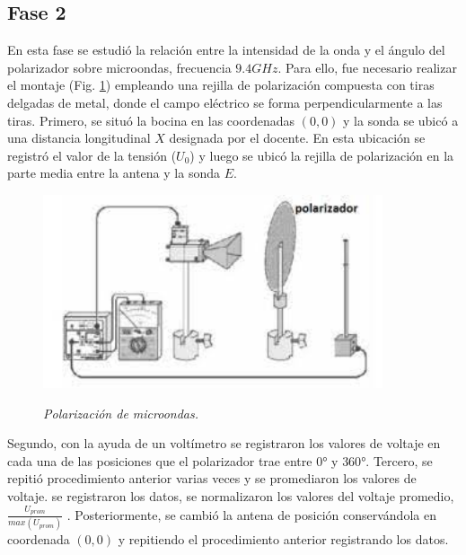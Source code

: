 \documentclass[spanish,notitlepage,letterpaper, 12pt]{article}
\begin{document}
\subsection{Fase 2}
En esta fase se estudió la relación entre la intensidad de la onda y el ángulo
del polarizador sobre microondas, frecuencia $9.4 GHz$. Para ello, fue necesario realizar el
montaje (Fig. \ref{fig:montaje2}) empleando una rejilla de polarización compuesta con tiras delgadas
de metal, donde el campo eléctrico se forma perpendicularmente a las tiras. Primero, se
situó la bocina en las coordenadas $(0,0)$ y la sonda se ubicó a una distancia
longitudinal $X$ designada por el docente. En esta ubicación se registró el valor de la
tensión ($U_0$) y luego se ubicó la rejilla de polarización en la parte media entre la antena y
la sonda $E$.\par
\begin{figure}[!ht]
    \centering
    \includegraphics[width=10.0cm]{images/montaje2.jpeg}
    \label{fig:montaje2}
    \caption{\textit{Polarización de microondas.}}
\end{figure}
Segundo, con la ayuda de un voltímetro se registraron los valores de voltaje en cada una de las
posiciones que el polarizador trae entre $0$° y $360$°. Tercero, se repitió procedimiento anterior
varias veces y se promediaron los valores de voltaje. se registraron los datos, se normalizaron
los valores del voltaje promedio, $\frac{U_{prom}}{max(U_{prom})}$
. Posteriormente, se cambió la antena
de posición conservándola en coordenada $(0,0)$ y repitiendo el procedimiento anterior
registrando los datos.
\end{document}
